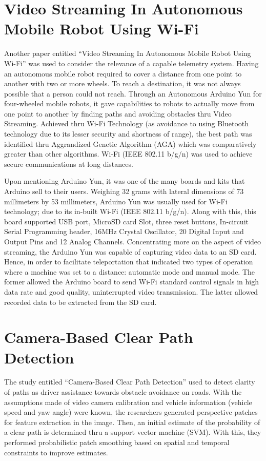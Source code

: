 \section{Video Streaming In Autonomous Mobile Robot Using Wi-Fi}
Another paper entitled “Video Streaming In Autonomous Mobile Robot Using Wi-Fi” was used to consider the relevance of a capable telemetry system. Having an autonomous mobile robot required to cover a distance from one point to another with two or more wheels. To reach a destination, it was not always possible that a person could not reach. Through an Autonomous Arduino Yun for four-wheeled mobile robots, it gave capabilities to robots to actually move from one point to another by finding paths and avoiding obstacles thru Video Streaming. Achieved thru Wi-Fi Technology (as avoidance to using Bluetooth technology due to its lesser security and shortness of range), the best path was identified thru Aggrandized Genetic Algorithm (AGA) which was comparatively greater than other algorithms. Wi-Fi (IEEE 802.11 b/g/n) was used to achieve secure communications at long distances.
 
Upon mentioning Arduino Yun, it was one of the many boards and kits that Arduino sell to their users. Weighing 32 grams with lateral dimensions of 73 millimeters by 53 millimeters, Arduino Yun was usually used for Wi-Fi technology; due to its in-built Wi-Fi (IEEE 802.11 b/g/n). Along with this, this board supported USB port, MicroSD card Slot, three reset buttons, In-circuit Serial Programming header, 16MHz Crystal Oscillator, 20 Digital Input and Output Pins and 12 Analog Channels. Concentrating more on the aspect of video streaming, the Arduino Yun was capable of capturing video data to an SD card. Hence, in order to facilitate teleportation that indicated two types of operation where a machine was set to a distance: automatic mode and manual mode. The former allowed the Arduino board to send Wi-Fi standard control signals in high data rate and good quality, uninterrupted video transmission. The latter allowed recorded data to be extracted from the SD card.

\section{Camera-Based Clear Path Detection}

The study entitled “Camera-Based Clear Path Detection” used to detect clarity of paths as driver assistance towards obstacle avoidance on roads. With the assumptions made of video camera calibration and vehicle information (vehicle speed and yaw angle) were known, the researchers generated perspective patches for feature extraction in the image. Then, an initial estimate of the probability of a clear path is determined thru a support vector machine (SVM). With this, they performed probabilistic patch smoothing based on spatial and temporal constraints to improve estimates.
 

